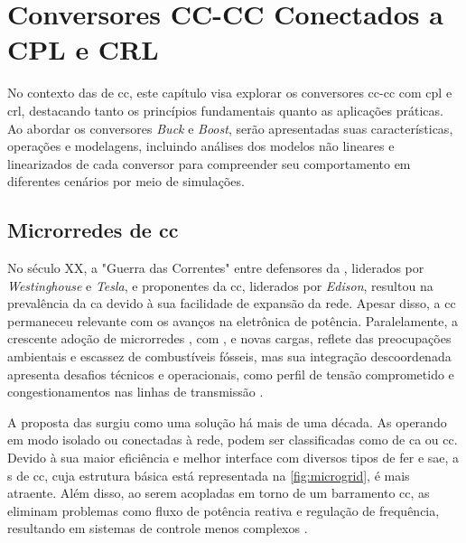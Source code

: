 \chapter{Conversores CC-CC Conectados a CPL e CRL} \label{cap3}

No contexto das  de \acrshort{cc}, este capítulo visa explorar os conversores \acrshort{cc}-\acrshort{cc} com \acrshort{cpl} e \acrshort{crl}, destacando tanto os princípios fundamentais quanto as aplicações práticas. Ao abordar os conversores \textit{Buck} e \textit{Boost}, serão apresentadas suas características, operações e modelagens, incluindo análises dos modelos não lineares e linearizados de cada conversor para compreender seu comportamento em diferentes cenários por meio de simulações.

\section{Microrredes de \acrshort{cc}}

No século XX, a "Guerra das Correntes" entre defensores da , liderados por \textit{Westinghouse} e \textit{Tesla}, e proponentes da \acrshort{cc}, liderados por \textit{Edison}, resultou na prevalência da \acrshort{ca} devido à sua facilidade de expansão da rede. Apesar disso, a \acrshort{cc} permaneceu relevante com os avanços na eletrônica de potência. Paralelamente, a crescente adoção de microrredes , com ,  e novas cargas, reflete das preocupações ambientais e escassez de combustíveis fósseis, mas sua integração descoordenada apresenta desafios técnicos e operacionais, como perfil de tensão comprometido e congestionamentos nas linhas de transmissão \citep{Elsayed2015, Dragicevic2015}.

A proposta das  surgiu como uma solução há mais de uma década. As  operando em modo isolado ou conectadas à rede, podem ser classificadas como  de \acrshort{ca} ou \acrshort{cc}. Devido à sua maior eficiência e melhor interface com diversos tipos de \acrshort{fer} e \acrshort{sae}, a s de \acrshort{cc}, cuja estrutura básica está representada na \autoref{fig:microgrid}, é mais atraente. Além disso, ao serem acopladas em torno de um barramento \acrshort{cc}, as  eliminam problemas como fluxo de potência reativa e regulação de frequência, resultando em sistemas de controle menos complexos \citep{Dragicevic2015}.

